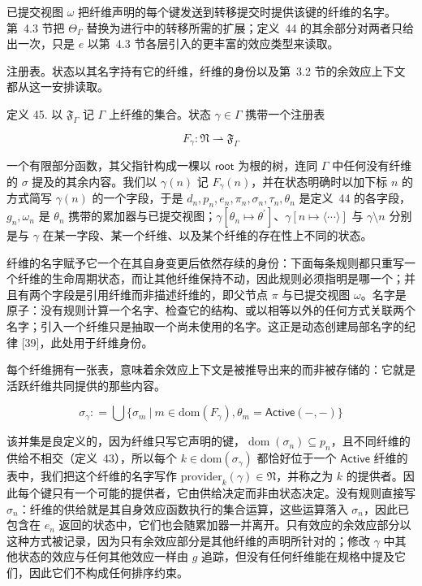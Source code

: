 \documentclass[
  10
]{article}
\begin{document}
已提交视图 \(\omega\) 把纤维声明的每个键发送到转移提交时提供该键的纤维的名字。第~4.3 节把 \(\Theta _ { \Gamma }\) 替换为进行中的转移所需的扩展；定义~44 的其余部分对两者只给出一次，只是 \(e\) 以第~4.3 节各层引入的更丰富的效应类型来读取。

注册表。状态以其名字持有它的纤维，纤维的身份以及第~3.2 节的余效应上下文都从这一安排读取。

定义 45. 以 \(\mathfrak { F } _ { \Gamma }\) 记 $\Gamma$ 上纤维的集合。状态 \(\gamma \in \Gamma\) 携带一个注册表

\[
F _ { \gamma } : \mathfrak { N } \rightharpoonup \mathfrak { F } _ { \Gamma }\tag{39}
\]

一个有限部分函数，其父指针构成一棵以 $\mathsf { r o o t }$ 为根的树，连同 $\Gamma$ 中任何没有纤维的 \(\sigma\) 提及的其余内容。我们以 \(\gamma ( n )\) 记 \(F _ { \gamma } ( n )\)，并在状态明确时以加下标 $n$ 的方式简写 \(\gamma ( n )\) 的一个字段，于是 \(d _ { n } , p _ { n } , e _ { n } , \pi _ { n } , \sigma _ { n } , \tau _ { n } , \theta _ { n }\) 是定义~44 的各字段，\(g _ { n } , \omega _ { n }\) 是 \(\theta _ { n }\) 携带的累加器与已提交视图；\(\gamma [ \theta _ { n } \mapsto \theta ^ { \prime } ]\)、$\gamma [ n \mapsto \langle \cdots \rangle ]$ 与 \(\gamma \setminus n\) 分别是与 \(\gamma\) 在某一字段、某一个纤维、以及某个纤维的存在性上不同的状态。

纤维的名字赋予它一个在其自身变更后依然存续的身份：下面每条规则都只重写一个纤维的生命周期状态，而让其他纤维保持不动，因此规则必须指明是哪一个；并且有两个字段是引用纤维而非描述纤维的，即父节点 $\pi$ 与已提交视图 $\omega$。名字是原子：没有规则计算一个名字、检查它的结构、或以相等以外的任何方式关联两个名字；引入一个纤维只是抽取一个尚未使用的名字。这正是动态创建局部名字的纪律 {[}39{]}，此处用于纤维身份。

每个纤维拥有一张表，意味着余效应上下文是被推导出来的而非被存储的：它就是活跃纤维共同提供的那些内容。

\[
\sigma _ { \gamma } : = \bigcup \{ \sigma _ { m } ~ | ~ m \in \mathrm { d o m } ( F _ { \gamma } ) , \theta _ { m } = \mathsf { A c t i v e } ( - , - ) \}\tag{40}
\]

该并集是良定义的，因为纤维只写它声明的键，\(\operatorname { d o m } ( \sigma _ { n } ) \subseteq p _ { n }\)，且不同纤维的供给不相交（定义~43），所以每个 \(k \in \mathrm { d o m } ( \sigma _ { \gamma } )\) 都恰好位于一个 $\mathsf { A c t i v e }$ 纤维的表中，我们把这个纤维的名字写作 \(\mathrm { p r o v i d e r } _ { k } ( \gamma ) \in \mathfrak { N }\)，并称之为 $k$ 的提供者。因此每个键只有一个可能的提供者，它由供给决定而非由状态决定。没有规则直接写 \(\sigma _ { n }\)：纤维的供给就是其自身效应函数执行的集合运算，这些运算落入 \(\sigma _ { n }\)，因此已包含在 \(e _ { n }\) 返回的状态中，它们也会随累加器一并离开。只有效应的余效应部分以这种方式被记录，因为只有余效应部分是其他纤维的声明所针对的；修改 $\gamma$ 中其他状态的效应与任何其他效应一样由 $g$ 追踪，但没有任何纤维能在规格中提及它们，因此它们不构成任何排序约束。
\end{document}
